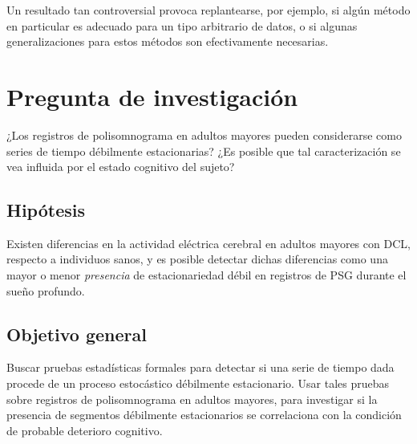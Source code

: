 Un resultado tan controversial provoca replantearse, por ejemplo, si algún método en particular es 
adecuado para un tipo arbitrario de datos, o si algunas generalizaciones para estos métodos son 
efectivamente necesarias.


\section{Pregunta de investigación}

¿Los registros de polisomnograma en adultos mayores pueden considerarse como series de tiempo 
débilmente estacionarias?
%
¿Es posible que tal caracterización se vea influida por el estado cognitivo del sujeto?


\subsection{Hipótesis}

Existen diferencias en la actividad eléctrica cerebral en adultos mayores con DCL, respecto a 
individuos sanos, y es posible detectar dichas diferencias como una mayor o menor 
\textit{presencia} de estacionariedad débil en registros de PSG durante el sueño profundo.


\subsection{Objetivo general}

Buscar pruebas estadísticas formales para detectar si una serie de tiempo dada procede de un 
proceso estocástico débilmente estacionario.
%
Usar tales pruebas sobre registros de polisomnograma en adultos mayores, para investigar si la 
presencia de segmentos débilmente estacionarios se correlaciona con la condición de probable
deterioro cognitivo.


